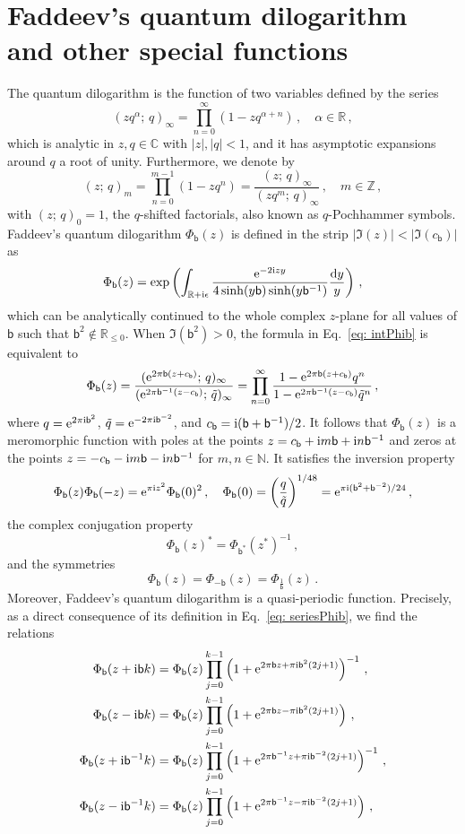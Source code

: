\documentclass[a4paper,11pt]{article}
\theoremstyle{definition}
\def\IZ{{\mathbb Z}}
\def\IR{{\mathbb R}}
\def\IC{{\mathbb C}}
\def\IN{{\mathbb N}}
\newcommand{\re}{{\rm e}}
\newcommand{\ri}{{\rm i}}
\newcommand{\rd}{{\rm d}}
\newcommand{\mb}{{\mathsf{b}}}
\newcommand{\be}{\begin{equation}}
\newcommand{\ee}{\end{equation}}
\newcommand{\sectiono}[1]{\section{#1}\setcounter{equation}{0}}
\begin{document}
\sectiono{Faddeev's quantum dilogarithm and other special functions} \label{app: faddeev}
The quantum dilogarithm is the function of two variables defined by the series~\cite{fk, Kirillov}
\be \label{eq: dilog}
(z q^{\alpha}; \, q)_{\infty} = \prod_{n=0}^{\infty} (1- z q^{\alpha+n}) \, , \quad \alpha \in \IR \, ,
\ee
which is analytic in $z,q \in \IC$ with $|z|, |q| <1$, and it has asymptotic expansions around $q$ a root of unity.
Furthermore, we denote by
\be \label{eq: qFactor}
(z; \, q)_m = \prod_{n=0}^{m-1} (1- z q^n) = \frac{(z; \, q)_{\infty}}{(z q^m; \, q)_{\infty}} \, , \quad m \in \IZ \, ,
\ee
with $(z; \, q)_0=1$, the $q$-shifted factorials, also known as $q$-Pochhammer symbols.
Faddeev's quantum dilogarithm $\Phi_{\mb}(z)$ is defined in the strip $| \Im (z) | < | \Im (c_{\mb}) |$ as~\cite{faddeev, fk}
\be \label{eq: intPhib}
\Phi_{\mb}(z) = \exp \left( \int_{\IR + \ri \epsilon} \frac{\re^{-2 \ri z y}}{4 \sinh(y \mb ) \sinh(y \mb^{-1})} \frac{\rd y}{y} \right) \, ,
\ee
which can be analytically continued to the whole complex $z$-plane for all values of $\mb$ such that $\mb^2 \notin \IR_{\le 0}$. When $\Im(\mb^2) >0$, the formula in Eq.~\eqref{eq: intPhib} is equivalent to
\be \label{eq: seriesPhib}
\Phi_{\mb}(z) = \frac{( \re^{2 \pi \mb (z + c_{\mb})}; \, q)_{\infty}}{(  \re^{2 \pi \mb^{-1} (z - c_{\mb})}; \, \tilde{q})_{\infty}} = \prod_{n=0}^{\infty} \frac{1-  \re^{2 \pi \mb (z + c_{\mb})} q^n}{1- \re^{2 \pi \mb^{-1} (z - c_{\mb})} \tilde{q}^n}\, ,
\ee
where $q = \re^{2 \pi \text{i} \mb^2}$, $\tilde{q} = \re^{- 2 \pi \text{i} \mb^{-2}}$, and $c_{\mb} = \ri (\mb + \mb^{-1})/2$. 
It follows that $\Phi_{\mb}(z)$ is a meromorphic function with poles at the points $z = c_{\mb} + \ri m \mb + \ri n \mb^{-1}$ and zeros at the points $z = -c_{\mb} - \ri m \mb - \ri n \mb^{-1}$ for $m,n \in \IN$. 
It satisfies the inversion property
\be
\Phi_{\mb}(z) \Phi_{\mb}(-z) = \re^{\pi \ri z^2} \Phi_{\mb}(0)^2 \, , \quad \Phi_{\mb}(0) = \left( \frac{q}{\tilde{q}} \right)^{1/48} = \re^{\pi \ri (\mb^2 + \mb^{-2})/24} \, ,
\ee
the complex conjugation property
\be
\Phi_{\mb}(z)^* = \Phi_{\mb^*}(z^*)^{-1} \, ,
\ee
and the symmetries
\be
\Phi_{\mb}(z) = \Phi_{-\mb}(z) = \Phi_{\frac{1}{\mb}}(z) \, .
\ee
Moreover, Faddeev's quantum dilogarithm is a quasi-periodic function. Precisely, as a direct consequence of its definition in Eq.~\eqref{eq: seriesPhib}, we find the relations
\begin{subequations} \label{periodicity}
\begin{align} 
\Phi_{\mb}(z + \ri \mb k) &= \Phi_{\mb}(z) \prod_{j=0}^{k-1} \left( 1 + \re^{2 \pi \mb z + \pi \ri \mb^2 (2 j +1)} \right)^{-1} \, , \label{PP}\\
\Phi_{\mb}(z - \ri \mb k) &= \Phi_{\mb}(z) \prod_{j=0}^{k-1} \left( 1 + \re^{2 \pi \mb z - \pi \ri \mb^2 (2 j +1)} \right) \, , \label{MP} \\
\Phi_{\mb}(z + \ri \mb^{-1} k) &= \Phi_{\mb}(z) \prod_{j=0}^{k-1} \left( 1 + \re^{2 \pi \mb^{-1} z + \pi \ri \mb^{-2} (2 j +1)} \right)^{-1} \, , \label{PM} \\
\Phi_{\mb}(z - \ri \mb^{-1} k) &= \Phi_{\mb}(z) \prod_{j=0}^{k-1} \left( 1 + \re^{2 \pi \mb^{-1} z - \pi \ri \mb^{-2} (2 j +1)} \right) \, , \label{MM}
\end{align}
\end{subequations}
\end{document}
